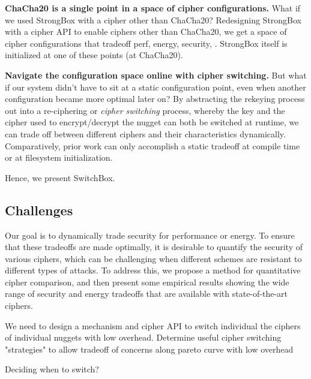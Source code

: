 \textbf{ChaCha20 is a single point in a space of cipher configurations.} What if
we used StrongBox with a cipher other than ChaCha20? Redesigning StrongBox with
a cipher API to enable ciphers other than ChaCha20, we get a space of cipher
configurations that tradeoff perf, energy, security, .
StrongBox itself is initialized at one of these points (at ChaCha20).

\textbf{Navigate the configuration space online with cipher switching.} But what
if our system didn't have to sit at a static configuration point, even when
another configuration became more optimal later on? By abstracting the rekeying
process out into a re-ciphering or \emph{cipher switching} process, whereby the
key and the cipher used to encrypt/decrypt the nugget can both be switched at
runtime, we can trade off between different ciphers and their characteristics
dynamically. Comparatively, prior work can only accomplish a static tradeoff at
compile time or at filesystem initialization.

Hence, we present SwitchBox. 

\subsection{Challenges}

Our goal is to dynamically trade security for performance or energy. To ensure
that these tradeoffs are made optimally, it is desirable to quantify the
security of various ciphers, which can be challenging when different schemes are
resistant to different types of attacks. To address this, we propose a method
for quantitative cipher comparison, and then present some empirical results
showing the wide range of security and energy tradeoffs that are available with
state-of-the-art ciphers.

We need to design a mechanism and cipher API to switch individual the ciphers of
individual nuggets with low overhead. Determine useful cipher switching
"strategies" to allow tradeoff of concerns along pareto curve with low overhead

Deciding when to switch?

